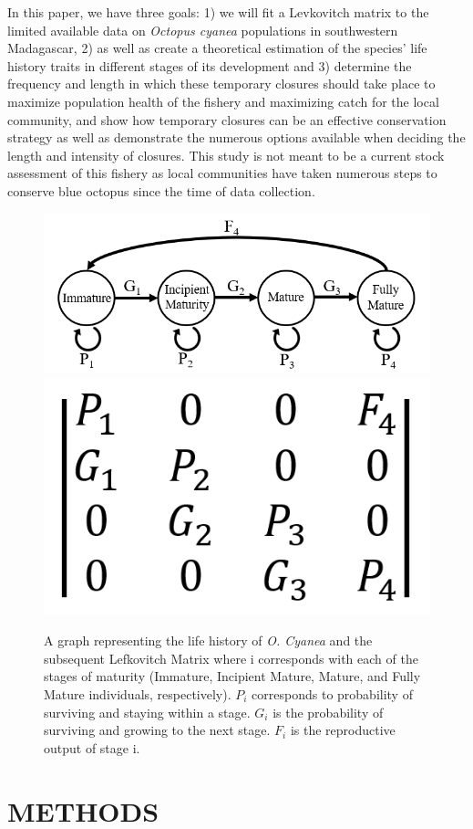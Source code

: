 \documentclass[
]{article}
\begin{document}
In this paper, we have three goals: 1) we will fit a Levkovitch matrix to the limited available data on \emph{Octopus cyanea} populations in southwestern Madagascar, 2) as well as create a theoretical estimation of the species' life history traits in different stages of its development and 3) determine the frequency and length in which these temporary closures should take place to maximize population health of the fishery and maximizing catch for the local community, and show how temporary closures can be an effective conservation strategy as well as demonstrate the numerous options available when deciding the length and intensity of closures. This study is not meant to be a current stock assessment of this fishery as local communities have taken numerous steps to conserve blue octopus since the time of data collection.



\begin{figure}
\includegraphics[width=0.45\linewidth]{LifeGraph} \includegraphics[width=0.45\linewidth]{MtxGeneric} \caption{A graph representing the life history of \emph{O. Cyanea} and the subsequent Lefkovitch Matrix where i corresponds with each of the stages of maturity (Immature, Incipient Mature, Mature, and Fully Mature individuals, respectively). \(P_i\) corresponds to probability of surviving and staying within a stage. \(G_i\) is the probability of surviving and growing to the next stage. \(F_i\) is the reproductive output of stage i. \label{LifeGraph}}\label{fig:LifeGraph}
\end{figure}

\hypertarget{methods}{%
\section{METHODS}\label{methods}}
\end{document}
